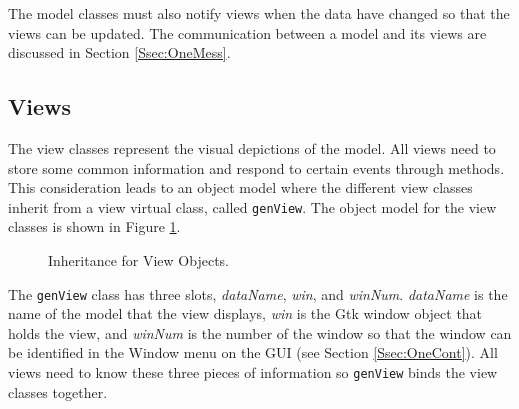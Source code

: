 \documentclass{article}[11pt]
\newcommand{\Rslot}[1]{\textsl{#1}}
\newcommand{\Rclass}[1]{\texttt{#1}}
\begin{document}
The model classes must also notify views when the data have changed
so that the views can be updated.  The communication between a model and its
views are discussed in Section \ref{Ssec:OneMess}. 

\subsection{Views}\label{Ssec:OneViews}

The view classes represent the visual depictions of the model.  All
views need to store some common information and respond to certain events
through methods.  This consideration leads to an object model where the
different view classes inherit from a view virtual class,
called \Rclass{genView}.  The object model for the view classes is
shown in Figure \ref{Fig:View}.

\begin{figure}[ht]
  \begin{center}
    \caption{ Inheritance for View Objects. }
    \label{Fig:View}
  \end{center}
\end{figure}

The \Rclass{genView} class has three slots, \Rslot{dataName}, \Rslot{win},
and \Rslot{winNum}.  \Rslot{dataName} is the name of the model that the view
displays, \Rslot{win} is the Gtk window object that holds the view, and
\Rslot{winNum} is the number of the window so that the window can be
identified in the Window menu on the GUI (see Section \ref{Ssec:OneCont}).
All views need to know these three pieces of information so
\Rclass{genView} binds the view classes together. 
\end{document}
